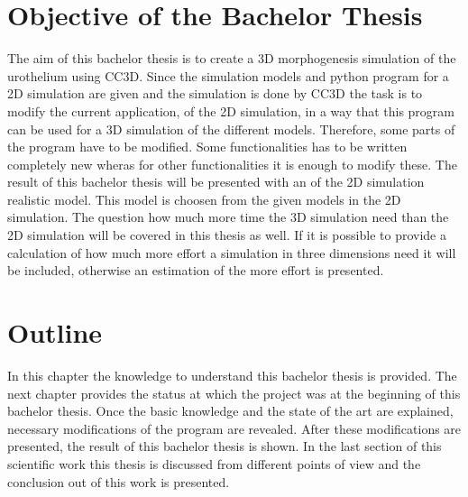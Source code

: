 \section{Objective of the Bachelor Thesis}
The aim of this bachelor thesis is to create a 3D morphogenesis simulation of the urothelium using \ac{CC3D}. Since the simulation models and python program for a 2D simulation are given and the simulation is done by \ac{CC3D} the task is to modify the current application, of the 2D simulation, in a way that this program can be used for a 3D simulation of the different models. \newline
Therefore, some parts of the program have to be modified. Some functionalities has to be written completely new wheras for other functionalities it is enough to modify these. \newline
The result of this bachelor thesis will be presented with an of the 2D simulation realistic model. This model is choosen from the given models in the 2D simulation. The question how much more time the 3D simulation need than the 2D simulation will be covered in this thesis as well. If it is possible to provide a calculation of how much more effort a simulation in three dimensions need it will be included, otherwise an estimation of the more effort is presented.


\section{Outline}
In this chapter the knowledge to understand this bachelor thesis is provided. The next chapter provides the status at which the project was at the beginning of this bachelor thesis. Once the basic knowledge and the state of the art are explained, necessary modifications of the program are revealed. After these modifications are presented, the result of this bachelor thesis is shown. In the last section of this scientific work this thesis is discussed from different points of view and the conclusion out of this work is presented.
